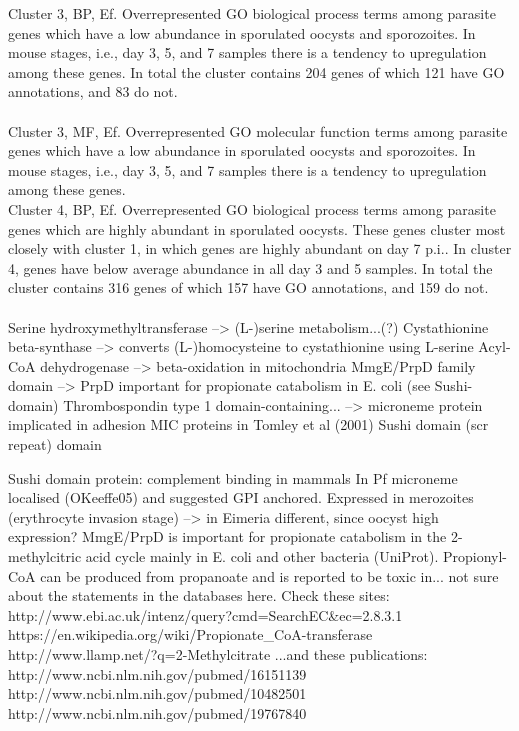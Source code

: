 \documentclass{article}
\begin{document}


Cluster 3, BP, Ef.
Overrepresented GO biological process terms among parasite genes which have a low
abundance in sporulated oocysts and sporozoites. In mouse stages, i.e., day 3, 5, and 7 samples
there is a tendency to upregulation among these genes. In total the cluster contains 204 genes of which 
121 have GO annotations, and 83 do not.\\
 \\


Cluster 3, MF, Ef.
Overrepresented GO molecular function terms among parasite genes which have a low
abundance in sporulated oocysts and sporozoites. In mouse stages, i.e., day 3, 5, and 7 samples
there is a tendency to upregulation among these genes.\\


Cluster 4, BP, Ef.
Overrepresented GO biological process terms among parasite genes which are highly abundant in
sporulated oocysts. These genes cluster most closely with cluster 1, in which genes are highly
abundant on day 7 p.i.. In cluster 4, genes have below average abundance in all day 3 and 5 samples.
In total the cluster contains 316 genes of which 157 have GO annotations, and 159 do not.\\
 \\
 
  Serine hydroxymethyltransferase --> (L-)serine metabolism...(?)
  Cystathionine beta-synthase -->  converts (L-)homocysteine to cystathionine using L-serine
  Acyl-CoA dehydrogenase    --> beta-oxidation in mitochondria
  MmgE/PrpD family domain -->  PrpD important for propionate catabolism in E. coli (see Sushi-domain)
  Thrombospondin type 1 domain-containing... --> microneme protein implicated in adhesion
                                                MIC proteins in Tomley et al (2001)
  Sushi domain (scr repeat) domain
  
  Sushi domain protein: complement binding in mammals
In Pf microneme localised (OKeeffe05) and suggested GPI anchored. Expressed in merozoites (erythrocyte invasion
stage) --> in Eimeria different, since oocyst high expression?
MmgE/PrpD is important for propionate catabolism in the 2-methylcitric acid cycle mainly in E. coli and
other bacteria (UniProt). Propionyl-CoA can be produced from propanoate and is reported to
be toxic in... not sure about the statements in the databases here. Check these sites:
http://www.ebi.ac.uk/intenz/query?cmd=SearchEC&ec=2.8.3.1
https://en.wikipedia.org/wiki/Propionate_CoA-transferase
http://www.llamp.net/?q=2-Methylcitrate%
...and these publications:
http://www.ncbi.nlm.nih.gov/pubmed/16151139
http://www.ncbi.nlm.nih.gov/pubmed/10482501
http://www.ncbi.nlm.nih.gov/pubmed/19767840
\end{document}
